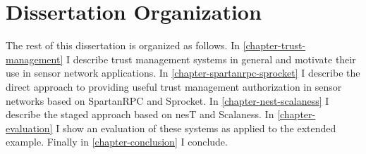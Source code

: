 \section{Dissertation Organization}

The rest of this dissertation is organized as follows. In \autoref{chapter-trust-management} I
describe trust management systems in general and motivate their use in sensor network
applications. In \autoref{chapter-spartanrpc-sprocket} I describe the direct approach to
providing useful trust management authorization in sensor networks based on SpartanRPC and
Sprocket. In \autoref{chapter-nest-scalaness} I describe the staged approach based on nesT and
Scalaness. In \autoref{chapter-evaluation} I show an evaluation of these systems as applied to
the extended example. Finally in \autoref{chapter-conclusion} I conclude.

